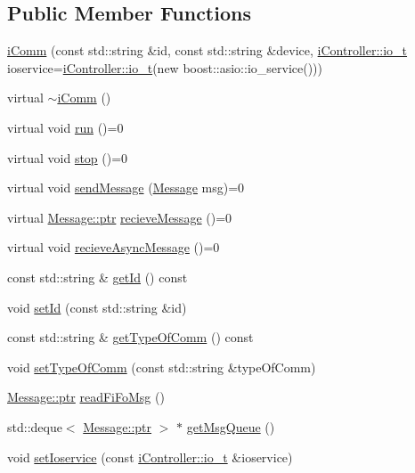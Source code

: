 \subsection*{Public Member Functions}
\begin{DoxyCompactItemize}
\item 
\hyperlink{classo_cpt_1_1i_comm_aed6a6ce6009f8fc9910058d0f64f4ccd}{i\+Comm} (const std\+::string \&id, const std\+::string \&device, \hyperlink{classo_cpt_1_1i_controller_a51c3436b03060209f6cd2ddce6df2d0c}{i\+Controller\+::io\+\_\+t} ioservice=\hyperlink{classo_cpt_1_1i_controller_a51c3436b03060209f6cd2ddce6df2d0c}{i\+Controller\+::io\+\_\+t}(new boost\+::asio\+::io\+\_\+service()))
\item 
virtual \hyperlink{classo_cpt_1_1i_comm_a817351ba50112bb3a850ed3098257a11}{$\sim$i\+Comm} ()
\item 
virtual void \hyperlink{classo_cpt_1_1i_comm_a0d15a29fb59dd6a74b56a126d03b9170}{run} ()=0
\item 
virtual void \hyperlink{classo_cpt_1_1i_comm_ad73564bd03146a576aaa37db1a38379f}{stop} ()=0
\item 
virtual void \hyperlink{classo_cpt_1_1i_comm_aed3d4364175d17efc0347b6e954f5aef}{send\+Message} (\hyperlink{structo_cpt_1_1i_comm_1_1_message}{Message} msg)=0
\item 
virtual \hyperlink{structo_cpt_1_1i_comm_1_1_message_ad2ba828ad76f96a30e3898b2609a4c01}{Message\+::ptr} \hyperlink{classo_cpt_1_1i_comm_a054ee0448f0d2773abce97c424c5c20c}{recieve\+Message} ()=0
\item 
virtual void \hyperlink{classo_cpt_1_1i_comm_a27a57fb90cfc9cce21552e8539f08dd7}{recieve\+Async\+Message} ()=0
\item 
const std\+::string \& \hyperlink{classo_cpt_1_1i_comm_a6040dafb80c889aa8d4b70b89e977ffa}{get\+Id} () const 
\item 
void \hyperlink{classo_cpt_1_1i_comm_ada67d85e8ca1c2b7931ab010de60cda7}{set\+Id} (const std\+::string \&id)
\item 
const std\+::string \& \hyperlink{classo_cpt_1_1i_comm_ad8c6b4ee36305bf76d3f23d60bb3bcb4}{get\+Type\+Of\+Comm} () const 
\item 
void \hyperlink{classo_cpt_1_1i_comm_ad5b257586d4fb17bcdf075e2401312a6}{set\+Type\+Of\+Comm} (const std\+::string \&type\+Of\+Comm)
\item 
\hyperlink{structo_cpt_1_1i_comm_1_1_message_ad2ba828ad76f96a30e3898b2609a4c01}{Message\+::ptr} \hyperlink{classo_cpt_1_1i_comm_a888e17cd4719170d4cc533ec4eaf1271}{read\+Fi\+Fo\+Msg} ()
\item 
std\+::deque$<$ \hyperlink{structo_cpt_1_1i_comm_1_1_message_ad2ba828ad76f96a30e3898b2609a4c01}{Message\+::ptr} $>$ $\ast$ \hyperlink{classo_cpt_1_1i_comm_a6fdac5c5dad398d31adf177c900b8054}{get\+Msg\+Queue} ()
\item 
void \hyperlink{classo_cpt_1_1i_comm_a7f8322024fbcc1c7ef1fae87fc6aa368}{set\+Ioservice} (const \hyperlink{classo_cpt_1_1i_controller_a51c3436b03060209f6cd2ddce6df2d0c}{i\+Controller\+::io\+\_\+t} \&ioservice)
\end{DoxyCompactItemize}
